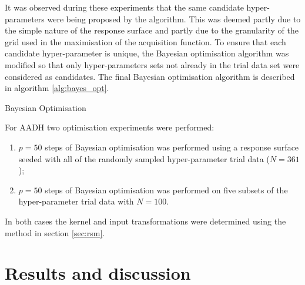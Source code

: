 It was observed during these experiments that the same candidate hyper-parameters were being proposed by the algorithm. This was deemed partly due to the simple nature of the response surface and partly due to the granularity of the grid used in the maximisation of the acquisition function. To ensure that each candidate hyper-parameter is unique, the Bayesian optimisation algorithm was modified so that only  hyper-parameters sets not already in the trial data set were considered as candidates. The final Bayesian optimisation algorithm is described in algorithm \ref{alg:bayes_opt}.

\begin{algorithm}\label{alg:bayes_opt}
\BlankLine
{}
\caption{Bayesian Optimisation}
\end{algorithm}

For AADH two optimisation experiments were performed:
\begin{enumerate}
    \item $p=50$ steps of Bayesian optimisation was performed using a response surface seeded with all of the randomly sampled hyper-parameter trial data ($N=361$);
    \item $p=50$ steps of Bayesian optimisation was performed on five subsets  of the hyper-parameter trial data with  $N=100$.
\end{enumerate} 
In both cases the kernel and input transformations were determined using the method in section \ref{sec:rsm}. 


\section{Results and discussion}
